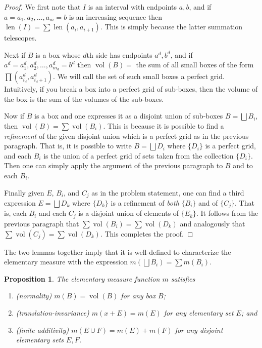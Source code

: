 \documentclass[11pt,oneside]{amsbook}
\DeclareMathOperator{\len}{len}
\DeclareMathOperator{\vol}{vol}
\theoremstyle{definition}
\theoremstyle{plain}
\newtheorem{prop}[thm]{Proposition}
\theoremstyle{definition}
\theoremstyle{remark}
\numberwithin{equation}{section}
\numberwithin{figure}{section}
\begin{document}
\begin{proof}
  We first note that $I$ is an interval with endpoints $a,b$, and if $a=a_1,a_2,\ldots,a_m=b$ is an increasing sequence then $\len(I)=\sum\len(a_i,a_{i+1})$. This is simply because the latter summation telescopes.
  
  Next if $B$ is a box whose $d$th side has endpoints $a^d,b^d$, and if $a^d=a_1^d,a_2^d,\ldots,a_{m_d}^d=b^d$ then $\vol(B)=$ the sum of all small boxes of the form $\prod(a_{i_d}^d,a_{i_d+1}^d)$. We will call the set of such small boxes a perfect grid. Intuitively, if you break a box into a perfect grid of sub-boxes, then the volume of the box is the sum of the volumes of the sub-boxes.

  Now if $B$ is a box and one expresses it as a disjoint union of sub-boxes $B=\bigsqcup B_i$, then $\vol(B)=\sum\vol(B_i)$. This is because it is possible to find a \emph{refinement} of the given disjoint union which is a perfect grid as in the previous paragraph. That is, it is possible to write $B=\bigsqcup D_i$ where $\{D_i\}$ is a perfect grid, and each $B_i$ is the union of a perfect grid of sets taken from the collection $\{D_i\}$. Then one can simply apply the argument of the previous paragraph to $B$ and to each $B_i$.

  Finally given $E$, $B_i$, and $C_j$ as in the problem statement, one can find a third expression $E=\bigsqcup D_k$ where $\{D_k\}$ is a refinement of \emph{both} $\{B_i\}$ and of $\{C_j\}$. That is, each $B_i$ and each $C_j$ is a disjoint union of elements of $\{E_k\}$. It follows from the previous paragraph that $\sum\vol(B_i)=\sum\vol(D_k)$ and analogously that $\sum\vol(C_j)=\sum\vol(D_k)$. This completes the proof.
\end{proof}

The two lemmas together imply that it is well-defined to characterize the elementary measure with the expression $m(\bigsqcup B_i)=\sum m(B_i)$.

\begin{prop}
  The elementary measure function $m$ satisfies
  \begin{enumerate}
  \item (normality) $m(B)=\vol(B)$ for any box $B$;
  \item (translation-invariance) $m(x+E)=m(E)$ for any elementary set $E$; and
  \item (finite additivity) $m(E\cup F)=m(E)+m(F)$ for any disjoint elementary sets $E,F$.
  \end{enumerate}
\end{prop}
\end{document}
